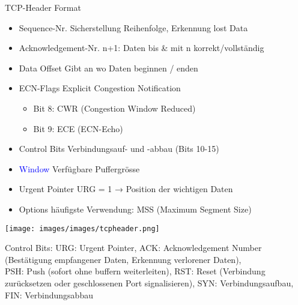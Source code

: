 \begin{concept}{TCP-Header Format}
    \begin{itemize}
        \item \textcolor{darkcorn}{Sequence-Nr.} {\small Sicherstellung Reihenfolge, Erkennung lost Data}
        \item \textcolor{darkcorn}{Acknowledgement-Nr.} {\small n+1: Daten bis \& mit n korrekt/vollständig}
        \item \textcolor{darkpurple}{Data Offset} Gibt an wo Daten beginnen / enden
        \item \textcolor{darkpurple}{ECN-Flags} Explicit Congestion Notification
        {\small
        \begin{itemize}
            \item Bit 8: CWR (Congestion Window Reduced)
            \item Bit 9: ECE (ECN-Echo)
        \end{itemize}}
        \item \textcolor{darkpurple}{Control Bits} Verbindungsauf- und -abbau (Bits 10-15)
        \item \textcolor{blue}{Window} Verfügbare Puffergrösse 
        \item \textcolor{darkpurple}{Urgent Pointer} URG = 1 → Position der wichtigen Daten
        \item \textcolor{darkpurple}{Options} häufigste Verwendung: MSS (Maximum Segment Size)
    \end{itemize}
    \texttt{[image: images/images/tcpheader.png]}
\end{concept}

\begin{remark} Control Bits:
    URG: Urgent Pointer,
        ACK: Acknowledgement Number (Bestätigung empfangener Daten, Erkennung verlorener Daten),\\
        PSH: Push (sofort ohne buffern weiterleiten),
        RST: Reset (Verbindung zurücksetzen oder geschlossenen Port signalisieren),
        SYN: Verbindungsaufbau,
        FIN: Verbindungsabbau
\end{remark}

\begin{comment}
\begin{concept}{Verbindungsorientierte Kommunikation}\\
    \texttt{[image: images/images/zustandsdiagramm\_tcp.png]}
\end{concept}

\end{comment}

